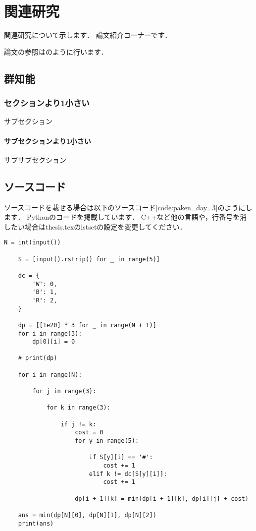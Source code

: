 
\chapter{関連研究}

関連研究について示します．
論文紹介コーナーです．

論文の参照は\cite{bib:bird_swarm}のように行います．

\section{群知能}

\subsection{セクションより1小さい}

サブセクション

\subsubsection{サブセクションより1小さい}

サブサブセクション

\section{ソースコード}

ソースコードを載せる場合は以下のソースコード\ref{code:paken_day_3}のようにします．
Pythonのコードを掲載しています．
C++など他の言語や，行番号を消したい場合はthesis.texのlstsetの設定を変更してください．

\begin{lstlisting}[caption=paken, label=code:paken_day_3]
    N = int(input())

    S = [input().rstrip() for _ in range(5)]
    
    dc = {
        'W': 0,
        'B': 1,
        'R': 2,
    }
    
    dp = [[1e20] * 3 for _ in range(N + 1)]
    for i in range(3):
        dp[0][i] = 0
    
    # print(dp)
    
    for i in range(N):
    
        for j in range(3):
    
            for k in range(3):
    
                if j != k:
                    cost = 0
                    for y in range(5):
    
                        if S[y][i] == '#':
                            cost += 1
                        elif k != dc[S[y][i]]:
                            cost += 1
    
                    dp[i + 1][k] = min(dp[i + 1][k], dp[i][j] + cost)
    
    ans = min(dp[N][0], dp[N][1], dp[N][2])
    print(ans)
    
\end{lstlisting}